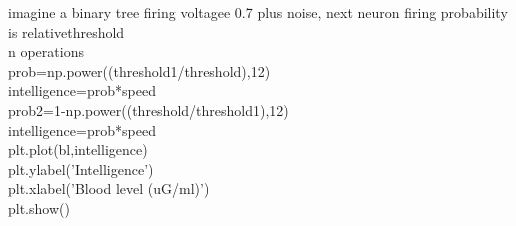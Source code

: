 imagine a binary tree firing voltagee 0.7 plus noise, next neuron firing probability is relativethreshold\\
n operations\\

prob=np.power((threshold1/threshold),12)\\
intelligence=prob*speed\\
prob2=1-np.power((threshold/threshold1),12)\\
intelligence=prob*speed\\

plt.plot(bl,intelligence)\\
plt.ylabel('Intelligence')\\
plt.xlabel('Blood level (uG/ml)')\\
plt.show()\\

